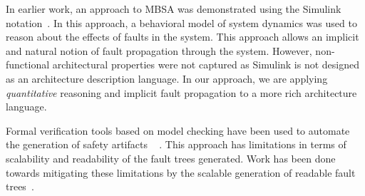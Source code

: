 In earlier work, an approach to MBSA was demonstrated using the Simulink notation~\cite{Joshi05:SafeComp,Joshi05:Dasc,NasaRep:MBSA-Aug05, MathWorks}. In this approach, a behavioral model of system dynamics was used to reason about the effects of faults in the system. This approach allows an implicit and natural notion of fault propagation through the system. However, non-functional architectural properties were not captured as Simulink is not designed as an architecture description language. In our approach, we are applying \textit{quantitative} reasoning and implicit fault propagation to a more rich architecture language. 

Formal verification tools based on model checking have been used to automate the generation of safety artifacts%
~\cite{Bozzano:2011:SDP:1992983.1992988, symbAltaRica,10.1007/978-3-540-75596-8-13, DBLP:conf/tacas/BittnerBCCGGMMZ16, Bozzano:2010:DSA:1951720} . This approach has limitations in terms of scalability and readability of the fault trees generated. Work has been done towards mitigating these limitations by the scalable generation of readable fault trees~\cite{10.1007/978-3-319-11936-6-7}. 


